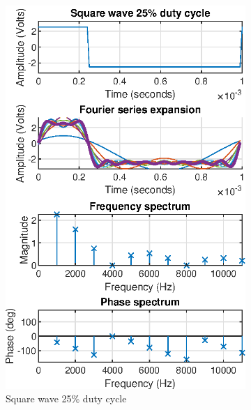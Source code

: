 \documentclass[notitlepage, a4paper, 11pt]{article}
\begin{document}
\begin{figure}[H]
\begin{subfigure}[][][t]{0.23\textwidth}
			\includegraphics[width=\textwidth]{../Matlab/img/sqr25}
			\caption{Square wave 25\% duty cycle}
		\end{subfigure}
		\hfill
		\begin{subfigure}[][][t]{0.23\textwidth}

\end{subfigure}
\end{figure}
\end{document}
